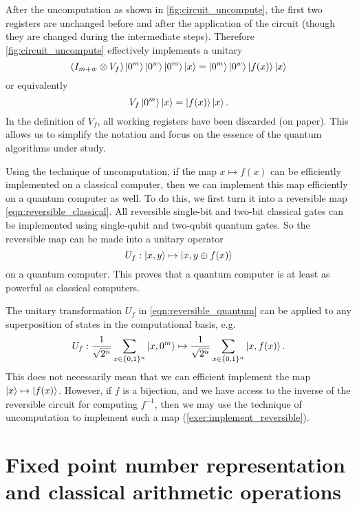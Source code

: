 \begin{rem}
After the uncomputation as shown in \cref{fig:circuit_uncompute}, the first two registers are unchanged before and after the application of the circuit (though they are changed during the intermediate steps). Therefore \cref{fig:circuit_uncompute} effectively implements a unitary
\begin{equation}
(I_{m+w}\otimes V_f)\ket{0^m}\ket{0^{w}}\ket{0^m}\ket{x}=\ket{0^m}\ket{0^{w}}\ket{f(x)}\ket{x}
\end{equation}
or equivalently
\begin{equation}
V_f\ket{0^m}\ket{x}=\ket{f(x)}\ket{x}.
\end{equation}
In the definition of $V_f$, all working registers have been discarded (on paper). This allows us to simplify the notation and focus on the essence of the quantum algorithms under study.
\end{rem}


Using the technique of uncomputation, if the map $x\mapsto f(x)$ can be efficiently implemented on a classical computer, then we can implement this map efficiently on a quantum computer as well. 
To do this, we first turn it into a reversible map \eqref{eqn:reversible_classical}.
All reversible single-bit and two-bit classical gates can be implemented using single-qubit and two-qubit quantum gates. 
So the reversible map can be made into a unitary operator
\begin{equation}
U_f: \ket{x,y}\mapsto \ket{x,y\oplus f(x)}
\label{eqn:reversible_quantum}
\end{equation}
on a quantum computer. This proves that a quantum computer is  at least as powerful as classical computers. 

The unitary transformation $U_f$ in \eqref{eqn:reversible_quantum} can be applied to any superposition of states in the computational basis, e.g. 
\begin{equation}
U_f: \frac{1}{\sqrt{2^n}}\sum_{x\in\{0,1\}^n} \ket{x,0^m} \mapsto \frac{1}{\sqrt{2^n}}\sum_{x\in\{0,1\}^n}
\ket{x,f(x)}.
\end{equation}
This does not necessarily mean that we can efficient implement the map $\ket{x}\mapsto \ket{f(x)}$. 
However, if $f$ is a bijection, and we have access to the inverse of the reversible circuit for computing $f^{-1}$, then we may use the technique of uncomputation to implement such a map (\cref{exer:implement_reversible}).


\section{Fixed point number representation and classical arithmetic operations}\label{sec:fixedpoint}

